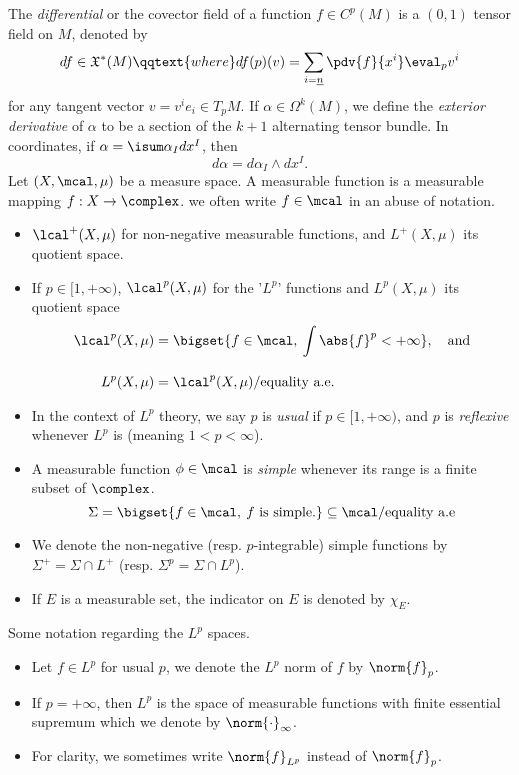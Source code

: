 \documentclass[../main-v2-manifolds.tex]{subfiles}
\begin{document}
The \emph{differential} or the covector field of a function $f\in C^p(M)$ is a $(0,1)$ tensor field on $M$, denoted by 
\[
    df\in\mathfrak{X}^*(M)\qqtext{where} df(p)(v) = \sum_{i=\underline{n}}\pdv{f}{x^i}\eval_pv^i
\]
for any tangent vector $v = v^ie_i\in T_pM$. If $\alpha\in \Omega^k(M)$, we define the \emph{exterior derivative} of $\alpha$ to be a section of the $k+1$ alternating tensor bundle. In coordinates, if $\alpha = \isum \alpha_I dx^I$, then 
\[
    d\alpha =  d\alpha_I \wedge dx^I.
\]
Let $(X,\mcal,\mu)$ be a measure space. A measurable function is a measurable mapping $f:X\to\complex$. we often write $f\in \mcal$ in an abuse of notation.
\begin{itemize}
    \item $\lcal^+(X,\mu)$ for non-negative measurable functions, and $L^+(X,\mu)$ its quotient space.
    \item If $p\in [1,+\infty)$, $\lcal^p(X,\mu)$ for the '$L^p$' functions and $L^p(X,\mu)$ its quotient space
    \begin{align*}
        \lcal^p(X,\mu) &= \bigset{f\in\mcal,\: \int\abs{f}^p<+\infty},\quad\text{and}\\[2ex]
        L^p(X,\mu) &= \lcal^p(X,\mu)/\text{equality a.e}.
    \end{align*}
    \item In the context of $L^p$ theory, we say $p$ is \emph{usual} if $p\in [1,+\infty)$, and $p$ is \emph{reflexive} whenever $L^p$ is (meaning $1< p <\infty$).
    \item A measurable function $\phi\in\mcal$ is \emph{simple} whenever its range is a finite subset of $\complex$. 
    \[
        \Sigma = \bigset{f\in\mcal,\: f\text{ is simple.}}\subseteq\mcal/{\text{equality a.e}}
    \]
    \item We denote the non-negative (resp. $p$-integrable) simple functions by $\Sigma^+ = \Sigma\cap L^+$ (resp. $\Sigma^p = \Sigma\cap L^p$).
    \item If $E$ is a measurable set, the indicator on $E$ is denoted by $\chi_E$.
\end{itemize}
Some notation regarding the $L^p$ spaces.
\begin{itemize}
    \item Let $f\in L^p$ for usual $p$, we denote the $L^p$ norm of $f$ by $\norm{f}_p$.
    \item If $p=+\infty$, then $L^p$ is the space of measurable functions with finite essential supremum which we denote by $\norm{\cdot}_{\infty}$. 
    \item For clarity, we sometimes write $\norm{f}_{L^p}$ instead of $\norm{f}_{p}$.
\end{itemize}
\end{document}
